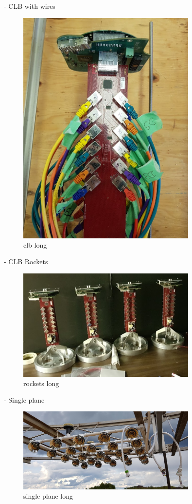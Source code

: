 - CLB with wires
\begin{figure}
    \includegraphics[width=0.8\textwidth]{diagrams/5-daq/clb.jpg}
    \caption[clb short]{clb long}
    \label{fig:clb}
\end{figure}
- CLB Rockets
\begin{figure}
    \includegraphics[width=0.8\textwidth]{diagrams/5-daq/rockets.jpg}
    \caption[rockets short]{rockets long}
    \label{fig:rockets}
\end{figure}
- Single plane
\begin{figure}
    \includegraphics[width=0.8\textwidth]{diagrams/5-daq/single_plane.jpg}
    \caption[single plane short]{single plane long}
    \label{fig:single_plane}
\end{figure}
